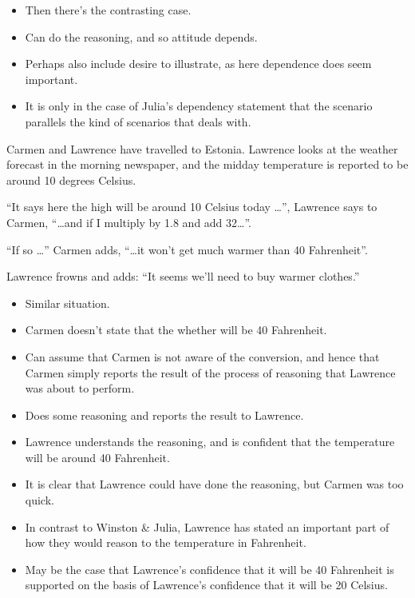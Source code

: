 \documentclass[10pt]{article}
\newcommand{\hozlinedash}[0]{%
  \noindent\hdashrule[0.5ex][c]{\textwidth}{.1pt}{2.5pt}
}
\begin{document}
\begin{itemize}
\item Then there's the contrasting case.
\item Can do the reasoning, and so attitude depends.
\item Perhaps also include desire to illustrate, as here dependence does seem important.
\end{itemize}

\begin{itemize}
\item It is only in the case of Julia's dependency statement that the scenario parallels the kind of scenarios that \citeauthor{Worsnip:2018aa} deals with.
\end{itemize}

\hozlinedash

\begin{scenario}
  Carmen and Lawrence have travelled to Estonia.
  Lawrence looks at the weather forecast in the morning newspaper, and the midday temperature is reported to be around 10 degrees Celsius.

  ``It says here the high will be around 10 Celsius today \dots'', Lawrence says to Carmen, ``\dots and if I multiply by 1.8 and add 32\dots''.

  ``If so \dots'' Carmen adds, ``\dots it won't get much warmer than 40 Fahrenheit''.

  Lawrence frowns and adds: ``It seems we'll need to buy warmer clothes.''
\end{scenario}

\begin{itemize}
\item Similar situation.
\item Carmen doesn't state that the whether will be 40 Fahrenheit.
\item Can assume that Carmen is not aware of the conversion, and hence that Carmen simply reports the result of the process of reasoning that Lawrence was about to perform.
\item Does some reasoning and reports the result to Lawrence.
\item Lawrence understands the reasoning, and is confident that the temperature will be around 40 Fahrenheit.
\item It is clear that Lawrence could have done the reasoning, but Carmen was too quick.
\item In contrast to Winston \& Julia, Lawrence has stated an important part of how they would reason to the temperature in Fahrenheit.
\item May be the case that Lawrence's confidence that it will be 40 Fahrenheit is supported on the basis of Lawrence's confidence that it will be 20 Celsius.
\end{itemize}
\end{document}
